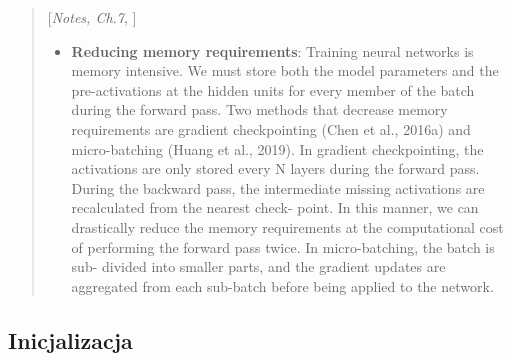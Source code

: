 \documentclass{myclass}
\numberwithin{equation}{subsection}
\begin{document}
\begin{quote}[\textit{Notes, Ch.7}, \cite{prince2023understanding}]
\begin{itemize}
    \item \textbf{Reducing memory requirements}: Training neural networks is memory intensive. We
    must store both the model parameters and the pre-activations at the hidden units for every
    member of the batch during the forward pass. Two methods that decrease memory requirements are
    gradient checkpointing (Chen et al., 2016a) and micro-batching (Huang et al., 2019). In gradient
    checkpointing, the activations are only stored every N layers during the forward pass. During
    the backward pass, the intermediate missing activations are recalculated from the nearest check-
    point. In this manner, we can drastically reduce the memory requirements at the computational
    cost of performing the forward pass twice. In micro-batching, the batch is sub- divided into
    smaller parts, and the gradient updates are aggregated from each sub-batch before being applied
    to the network.
\end{itemize}
\end{quote}


\subsection{Inicjalizacja}
\end{document}
